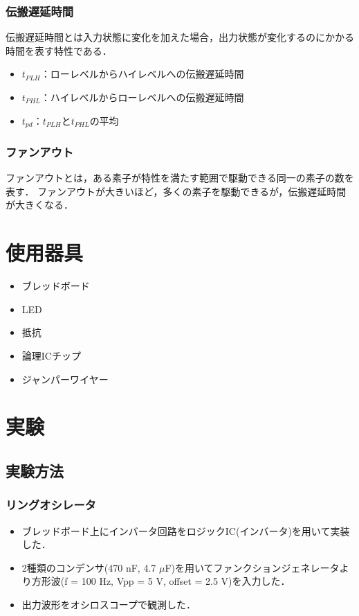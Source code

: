 \documentclass{ltjsarticle}
\begin{document}
\subsubsection{伝搬遅延時間}
伝搬遅延時間とは入力状態に変化を加えた場合，出力状態が変化するのにかかる時間を表す特性である．
\begin{itemize}
  \item ${t_{PLH}}$：ローレベルからハイレベルへの伝搬遅延時間
  \item ${t_{PHL}}$：ハイレベルからローレベルへの伝搬遅延時間
  \item ${t_{pd}}$：${t_{PLH}}$と${t_{PHL}}$の平均
\end{itemize}

\subsubsection{ファンアウト}
ファンアウトとは，ある素子が特性を満たす範囲で駆動できる同一の素子の数を表す．
ファンアウトが大きいほど，多くの素子を駆動できるが，伝搬遅延時間が大きくなる．


\section{使用器具}
\begin{itemize}
  \item ブレッドボード
  \item LED
  \item 抵抗
  \item 論理ICチップ
  \item ジャンパーワイヤー
\end{itemize}

\section{実験}
\subsection{実験方法}
\subsubsection{リングオシレータ}
\begin{itemize}
  \item ブレッドボード上にインバータ回路をロジックIC(インバータ)を用いて実装した．
  \item 2種類のコンデンサ(470 nF, 4.7 $\mu$F)を用いてファンクションジェネレータより方形波(f = 100 Hz, Vpp = 5 V, offset = 2.5 V)を入力した．
  \item 出力波形をオシロスコープで観測した．
\end{itemize}
\end{document}
